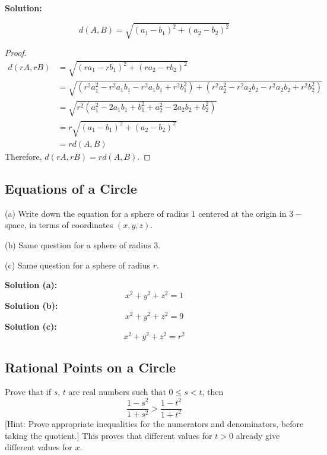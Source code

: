 \textbf{Solution:}

\[d(A, B) = \sqrt{(a_1 - b_1)^2 + (a_2 - b_2)^2}\]

\begin{proof}
    \begin{align*}
        d(rA, rB) &= \sqrt{(r a_1 - r b_1)^2 + (r a_2 - r b_2)^2} \\
                  &= \sqrt{(r^2 a_1^2 - r^2 a_1 b_1 - r^2 a_1 b_1 + r^2 b_1^2) + (r^2 a_2^2 - r^2 a_2 b_2 - r^2 a_2 b_2 + r^2 b_2^2)} \\
                  &= \sqrt{r^2 (a_1^2 - 2 a_1 b_1 + b_1^2 +  a_2^2 - 2 a_2 b_2 + b_2^2)} \\
                  &= r \sqrt{(a_1 - b_1)^2 + (a_2 - b_2)^2} \\
                  &= r d(A, B)
    \end{align*}
    Therefore, $d(rA, rB) = r d(A, B)$.
\end{proof}

\subsection{Equations of a Circle}

\begin{tcolorbox}[title=Problem 19, breakable]
    (a) Write down the equation for a sphere of radius $1$ centered
        at the origin in $3-$space, in terms of coordinates $(x, y, z)$.

    (b) Same question for a sphere of radius $3$.

    (c) Same question for a sphere of radius $r$.
\end{tcolorbox}

\textbf{Solution (a):}
\[x^2 + y^2 + z^2 = 1\]
\textbf{Solution (b):}
\[x^2 + y^2 + z^2 = 9\]
\textbf{Solution (c):}
\[x^2 + y^2 + z^2 = r^2\]

\subsection{Rational Points on a Circle}

\begin{tcolorbox}[title=Problem 2, breakable]
    Prove that if $s$, $t$ are real numbers such that $0 \le s < t$, then 
    \[\frac{1 - s^2}{1 + s^2} > \frac{1 - t^2}{1 + t^2}\]
    [Hint: Prove appropriate inequalities for the numerators and denominators,
    before taking the quotient.] This proves that different values for $t > 0$
    already give different values for $x$.
\end{tcolorbox}

